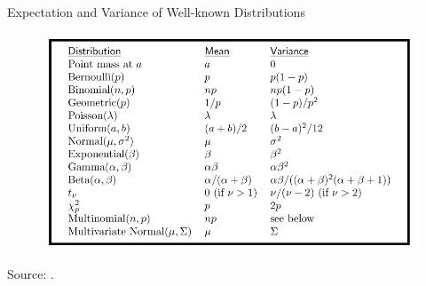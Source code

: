 \documentclass[handout]{beamer}
\begin{document}
\begin{frame}{Expectation and Variance of Well-known Distributions}
 
\begin{figure}[h!]
	\centering
	\includegraphics[scale=0.4]{pics/expectations.png}
\end{figure} 
 
Source: \cite{wasserman2013all}.
 
\end{frame}
\end{document}
